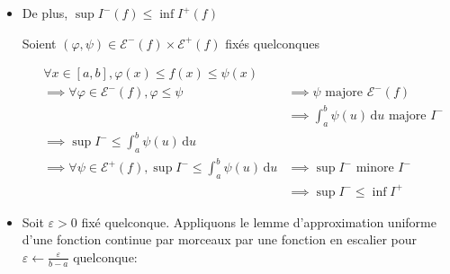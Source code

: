 \documentclass{article}
\renewenvironment{question_kholle}[2][ ]
{
	\subsection{\texorpdfstring{#2}{}}
	\notblank{#1}
	{
		\noindent #1
		\bigbreak
	}
	{}
	\begin{proof}
}
{
	\end{proof}
}
\begin{document}
\begin{question_kholle}
\begin{itemize}[label=$\lozenge$]
\begin{itemize}[label=$\star$]
			            \begin{align*}
				            \forall x \in [a, b], \varphi(x)\leqslant f(x) & \leqslant \|f\|_{\infty, [a, b]}                              \\
				            \implies \varphi                               & \leqslant \|f\|_{\infty[a, b]}                                \\
				            \implies \int_{a}^{b} \varphi(u) \, \mathrm du & \leqslant  \int_{a}^{b} \|f\|_{\infty, [a, b]}  \, \mathrm dt
			            \end{align*}
		      \end{itemize}

		      On procède de la même manière pour la borne inf de $I^{+}(f)$

		\item De plus, $\sup I^{-}(f) \leqslant \inf I^{+}(f)$

		      Soient $(\varphi, \psi) \in \mathcal{E}^{-}(f)\times \mathcal{E}^{+}(f)$ fixés quelconques


		      \begin{align*}
			       & \forall x \in [a, b], \varphi(x) \leqslant f(x) \leqslant \psi(x)                                                                                                           \\
			       & \implies \forall \varphi \in \mathcal{E}^{-}(f), \varphi \leqslant \psi                                & \implies \psi \text{ majore } \mathcal{E}^{-}(f)                   \\
			       &                                                                                                        & \implies \int_{a}^{b} \psi(u) \, \mathrm du  \text{ majore } I^{-} \\
			       & \implies \sup I^{-} \leqslant \int_{a}^{b} \psi(u) \, \mathrm du                                                                                                            \\
			       & \implies \forall \psi \in \mathcal{E}^{+}(f), \sup I^{-} \leqslant \int_{a}^{b} \psi(u)  \, \mathrm du & \implies \sup I^{-} \text{ minore } I^{-}                          \\
			       &                                                                                                        & \implies \sup I^{-} \leqslant \inf I^{+}
		      \end{align*}


		\item Soit $\varepsilon > 0$ fixé quelconque.
		      Appliquons le lemme d'approximation uniforme d'une fonction continue par morceaux par une fonction en escalier pour $\varepsilon \leftarrow \frac{\varepsilon}{b-a}$ quelconque:


\end{itemize}
\end{question_kholle}
\end{document}
